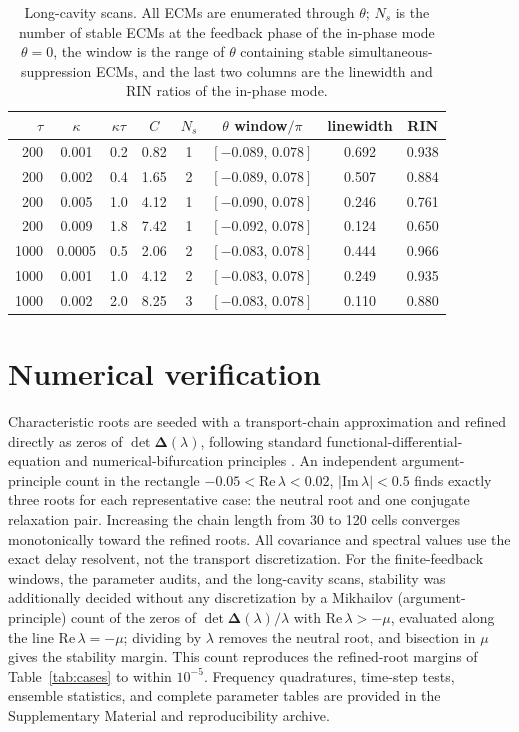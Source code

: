 \documentclass{optica-article}
\newif\ifmarked
\newcommand{\rev}[1]{\ifmarked{\color{blue}#1}\else#1\fi}
\newenvironment{revised}{\ifmarked\color{blue}\fi}{}
\newcommand{\Dmat}{\bm{\Delta}}
\begin{document}
\begin{revised}
\begin{table}[t]
\centering
\caption{Long-cavity scans. All ECMs are enumerated through $\theta$; $N_s$ is the number of stable ECMs at the feedback phase of the in-phase mode $\theta=0$, the window is the range of $\theta$ containing stable simultaneous-suppression ECMs, and the last two columns are the linewidth and RIN ratios of the in-phase mode.}
\label{tab:long}
\begin{tabular}{rccccccc}
\toprule
$\tau$ & $\kappa$ & $\kappa\tau$ & $C$ & $N_s$ & $\theta$ window$/\pi$ & linewidth & RIN\\
\midrule
200 & 0.001 & 0.2 & 0.82 & 1 & $[-0.089,\,0.078]$ & 0.692 & 0.938\\
200 & 0.002 & 0.4 & 1.65 & 2 & $[-0.089,\,0.078]$ & 0.507 & 0.884\\
200 & 0.005 & 1.0 & 4.12 & 1 & $[-0.090,\,0.078]$ & 0.246 & 0.761\\
200 & 0.009 & 1.8 & 7.42 & 1 & $[-0.092,\,0.078]$ & 0.124 & 0.650\\
1000 & 0.0005 & 0.5 & 2.06 & 2 & $[-0.083,\,0.078]$ & 0.444 & 0.966\\
1000 & 0.001 & 1.0 & 4.12 & 2 & $[-0.083,\,0.078]$ & 0.249 & 0.935\\
1000 & 0.002 & 2.0 & 8.25 & 3 & $[-0.083,\,0.078]$ & 0.110 & 0.880\\
\bottomrule
\end{tabular}

\end{table}
\end{revised}

\section{Numerical verification}

Characteristic roots are seeded with a transport-chain approximation and refined directly as zeros of $\det\Dmat(\lambda)$, following standard functional-differential-equation and numerical-bifurcation principles \cite{Hale1993,Engelborghs2002}. An independent argument-principle count in the rectangle $-0.05<\mathrm{Re}\,\lambda<0.02$, $|\mathrm{Im}\,\lambda|<0.5$ finds exactly three roots for each representative case: the neutral root and one conjugate relaxation pair. Increasing the chain length from 30 to 120 cells converges monotonically toward the refined roots. All covariance and spectral values use the exact delay resolvent, not the transport discretization. \rev{For the finite-feedback windows, the parameter audits, and the long-cavity scans, stability was additionally decided without any discretization by a Mikhailov (argument-principle) count of the zeros of $\det\Dmat(\lambda)/\lambda$ with $\mathrm{Re}\,\lambda>-\mu$, evaluated along the line $\mathrm{Re}\,\lambda=-\mu$; dividing by $\lambda$ removes the neutral root, and bisection in $\mu$ gives the stability margin. This count reproduces the refined-root margins of Table~\ref{tab:cases} to within $10^{-5}$.} Frequency quadratures, time-step tests, ensemble statistics, and complete parameter tables are provided in the Supplementary Material and reproducibility archive.
\end{document}
